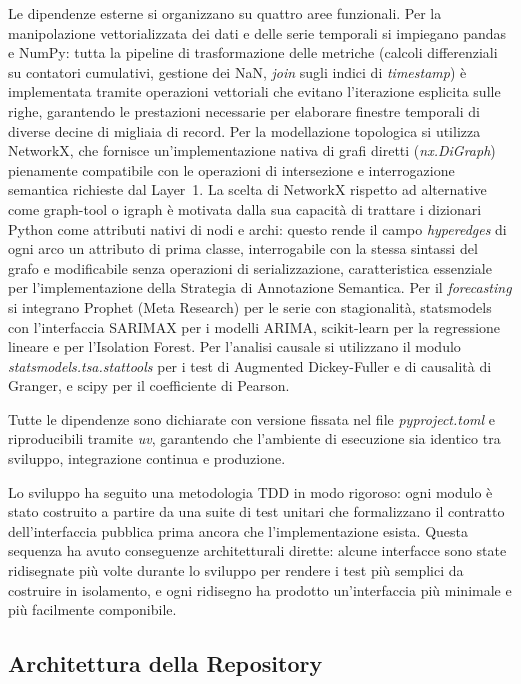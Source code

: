 Le dipendenze esterne si organizzano su quattro aree funzionali. Per la manipolazione vettorializzata
dei dati e delle serie temporali si impiegano pandas e NumPy: tutta la pipeline di trasformazione
delle metriche (calcoli differenziali su contatori cumulativi, gestione dei NaN, \textit{join}
sugli indici di \textit{timestamp}) è implementata tramite operazioni vettoriali che evitano
l'iterazione esplicita sulle righe, garantendo le prestazioni necessarie per elaborare finestre
temporali di diverse decine di migliaia di record. Per la modellazione topologica si utilizza
NetworkX, che fornisce un'implementazione nativa di grafi diretti (\textit{nx.DiGraph}) pienamente
compatibile con le operazioni di intersezione e interrogazione semantica richieste dal Layer~1.
La scelta di NetworkX rispetto ad alternative come graph-tool o igraph è motivata dalla sua
capacità di trattare i dizionari Python come attributi nativi di nodi e archi: questo rende il
campo \textit{hyperedges} di ogni arco un attributo di prima classe, interrogabile con la stessa
sintassi del grafo e modificabile senza operazioni di serializzazione, caratteristica essenziale
per l'implementazione della Strategia di Annotazione Semantica. Per il \textit{forecasting} si
integrano Prophet (Meta Research) per le serie con stagionalità, statsmodels con l'interfaccia
SARIMAX per i modelli \gls{ARIMA}, scikit-learn per la regressione lineare e per l'Isolation
Forest. Per l'analisi causale si utilizzano il modulo \textit{statsmodels.tsa.stattools} per i
test di Augmented Dickey-Fuller e di causalità di Granger, e scipy per il coefficiente di
Pearson.

Tutte le dipendenze sono dichiarate con versione fissata nel file \textit{pyproject.toml} e
riproducibili tramite \textit{uv}, garantendo che l'ambiente di esecuzione sia identico tra
sviluppo, integrazione continua e produzione.

Lo sviluppo ha seguito una metodologia \gls{TDD} in modo rigoroso: ogni modulo è stato costruito
a partire da una suite di test unitari che formalizzano il contratto dell'interfaccia pubblica
prima ancora che l'implementazione esista. Questa sequenza ha avuto conseguenze architetturali
dirette: alcune interfacce sono state ridisegnate più volte durante lo sviluppo per rendere i
test più semplici da costruire in isolamento, e ogni ridisegno ha prodotto un'interfaccia più
minimale e più facilmente componibile.

\subsection{Architettura della Repository}
\label{sec:architettura_repo}


